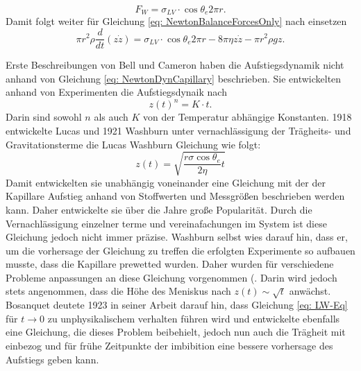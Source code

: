 \begin{equation}
    F_W = \sigma_{LV} \cdot \cos \theta_e 2\pi r.
\end{equation}
Damit folgt weiter für Gleichung \ref{eq: NewtonBalanceForcesOnly} nach einsetzen \cite{fricke2023AnalyticalStudyCapillary}
\begin{equation}
\label{eq: NewtonDynCapillary}
    \pi r^2 \rho \frac{d}{dt} (z \dot{z}) = \sigma_{LV} \cdot \cos \theta_e 2\pi r-8\pi\eta z \dot{z}-\pi r^2 \rho g z.
\end{equation}

Erste Beschreibungen von Bell und Cameron \cite{bell1906FlowLiquidsCapillary} haben die Aufstiegsdynamik nicht anhand von Gleichung \ref{eq: NewtonDynCapillary} beschrieben. Sie entwickelten anhand von Experimenten die Aufstiegsdynaik nach 
\begin{equation}
    z(t)^n = K\cdot t.
\end{equation}
Darin sind sowohl $n$ als auch $K$ von der Temperatur abhängige Konstanten. 1918 entwickelte Lucas \cite{lucas1918UeberZeitgesetzKapillaren} und 1921 Washburn \cite{washburn1921DynamicsCapillaryFlow} unter vernachlässigung der Trägheits- und Gravitationsterme die Lucas Washburn Gleichung wie folgt:
\begin{equation}
\label{eq: LW-Eq}
    z(t) = \sqrt{\frac{r\sigma\cos\theta_e}{2\eta}t}
\end{equation}
Damit entwickelten sie unabhängig voneinander eine Gleichung mit der der Kapillare Aufstieg anhand von Stoffwerten und Messgrößen beschrieben werden kann. Daher entwickelte sie über die Jahre große Popularität. Durch die Vernachlässigung einzelner terme und vereinafachungen im System ist diese Gleichung jedoch nicht immer präzise. Washburn selbst wies darauf hin, dass er, um die vorhersage der Gleichung zu treffen die erfolgten Experimente so aufbauen musste, dass die Kapillare prewetted wurden. 
Daher wurden für verschiedene Probleme anpassungen an diese Gleichung vorgenommen
(. Darin wird jedoch stets angenommen, dass die Höhe des Meniskus nach $z(t)\sim \sqrt{t}$ anwächst.
Bosanquet \cite{bosanquet1923LVFlowLiquids} deutete 1923 in seiner Arbeit darauf hin, dass Gleichung \ref{eq: LW-Eq} für $t\xrightarrow{}0$ zu unphysikalischem verhalten führen wird und entwickelte ebenfalls eine Gleichung, die dieses Problem beibehielt, jedoch nun auch die Trägheit mit einbezog und für frühe Zeitpunkte der imbibition eine bessere vorhersage des Aufstiegs geben kann. 
